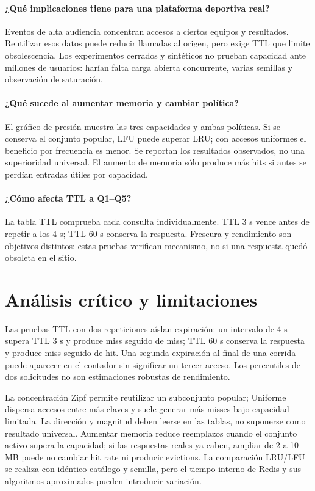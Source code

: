 \documentclass[11pt]{article}
\begin{document}
\paragraph{¿Qué implicaciones tiene para una plataforma deportiva real?} Eventos de alta audiencia concentran accesos a ciertos equipos y resultados. Reutilizar esos datos puede reducir llamadas al origen, pero exige TTL que limite obsolescencia. Los experimentos cerrados y sintéticos no prueban capacidad ante millones de usuarios: harían falta carga abierta concurrente, varias semillas y observación de saturación.
\paragraph{¿Qué sucede al aumentar memoria y cambiar política?} El gráfico de presión muestra las tres capacidades y ambas políticas. Si se conserva el conjunto popular, LFU puede superar LRU; con accesos uniformes el beneficio por frecuencia es menor. Se reportan los resultados observados, no una superioridad universal. El aumento de memoria sólo produce más hits si antes se perdían entradas útiles por capacidad.
\paragraph{¿Cómo afecta TTL a Q1--Q5?} La tabla TTL comprueba cada consulta individualmente. TTL 3 s vence antes de repetir a los 4 s; TTL 60 s conserva la respuesta. Frescura y rendimiento son objetivos distintos: estas pruebas verifican mecanismo, no si una respuesta quedó obsoleta en el sitio.
\section{Análisis crítico y limitaciones}
Las pruebas TTL con dos repeticiones aíslan expiración: un intervalo de 4 s supera TTL 3 s y produce miss seguido de miss; TTL 60 s conserva la respuesta y produce miss seguido de hit. Una segunda expiración al final de una corrida puede aparecer en el contador sin significar un tercer acceso. Los percentiles de dos solicitudes no son estimaciones robustas de rendimiento.

La concentración Zipf permite reutilizar un subconjunto popular; Uniforme dispersa accesos entre más claves y suele generar más misses bajo capacidad limitada. La dirección y magnitud deben leerse en las tablas, no suponerse como resultado universal. Aumentar memoria reduce reemplazos cuando el conjunto activo supera la capacidad; si las respuestas reales ya caben, ampliar de 2 a 10 MB puede no cambiar hit rate ni producir evictions. La comparación LRU/LFU se realiza con idéntico catálogo y semilla, pero el tiempo interno de Redis y sus algoritmos aproximados pueden introducir variación.
\end{document}
